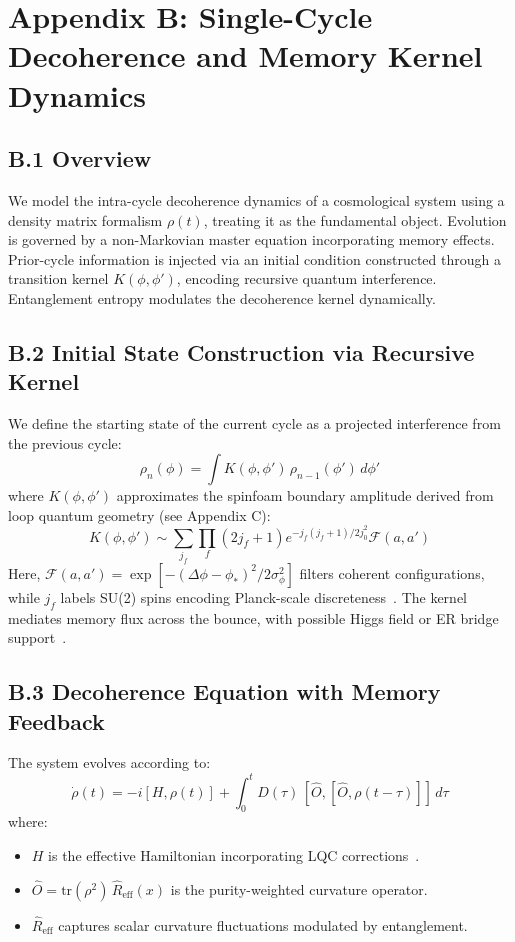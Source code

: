 \section*{Appendix B: Single-Cycle Decoherence and Memory Kernel Dynamics}

\subsection*{B.1 Overview}

We model the intra-cycle decoherence dynamics of a cosmological system using a density matrix formalism \( \rho(t) \), treating it as the fundamental object. Evolution is governed by a non-Markovian master equation incorporating memory effects. Prior-cycle information is injected via an initial condition constructed through a transition kernel \( K(\phi, \phi') \), encoding recursive quantum interference. Entanglement entropy modulates the decoherence kernel dynamically.

\subsection*{B.2 Initial State Construction via Recursive Kernel}

We define the starting state of the current cycle as a projected interference from the previous cycle:
\[
\rho_n(\phi) = \int K(\phi, \phi') \, \rho_{n-1}(\phi') \, d\phi'
\]
where \( K(\phi, \phi') \) approximates the spinfoam boundary amplitude derived from loop quantum geometry (see Appendix C):
\[
K(\phi, \phi') \sim \sum_{j_f} \prod_f (2j_f+1) e^{-j_f(j_f+1)/2j_0^2} \mathcal{F}(a,a')
\]
Here, \( \mathcal{F}(a,a') = \exp[-(\Delta\phi-\phi_*)^2/2\sigma_\phi^2] \) filters coherent configurations, while \( j_f \) labels SU(2) spins encoding Planck-scale discreteness~\cite{rovelli2004quantum,engle2008lqg}. The kernel mediates memory flux across the bounce, with possible Higgs field or ER bridge support~\cite{maldacena2013cool}.

\subsection*{B.3 Decoherence Equation with Memory Feedback}

The system evolves according to:
\[
\dot{\rho}(t) = -i[H, \rho(t)] + \int_0^t D(\tau) \, [\hat{O}, [\hat{O}, \rho(t - \tau)]] \, d\tau
\]
where:
\begin{itemize}
    \item \( H \) is the effective Hamiltonian incorporating LQC corrections~\cite{ashtekar2006quantum}.
    \item \( \hat{O} = \text{tr}(\rho^2) \, \hat{R}_{\text{eff}}(x) \) is the purity-weighted curvature operator.
    \item \( \hat{R}_{\text{eff}} \) captures scalar curvature fluctuations modulated by entanglement.
\end{itemize}

